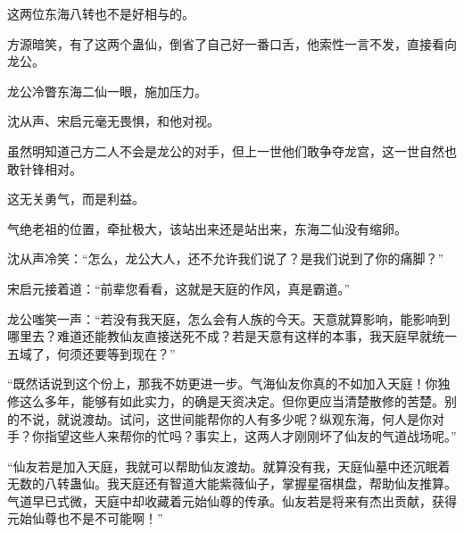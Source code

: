 \begin{this_body}
这两位东海八转也不是好相与的。

方源暗笑，有了这两个蛊仙，倒省了自己好一番口舌，他索性一言不发，直接看向龙公。

龙公冷瞥东海二仙一眼，施加压力。

沈从声、宋启元毫无畏惧，和他对视。

虽然明知道己方二人不会是龙公的对手，但上一世他们敢争夺龙宫，这一世自然也敢针锋相对。

这无关勇气，而是利益。

气绝老祖的位置，牵扯极大，该站出来还是站出来，东海二仙没有缩卵。

沈从声冷笑：“怎么，龙公大人，还不允许我们说了？是我们说到了你的痛脚？”

宋启元接着道：“前辈您看看，这就是天庭的作风，真是霸道。”

龙公嗤笑一声：“若没有我天庭，怎么会有人族的今天。天意就算影响，能影响到哪里去？难道还能教仙友直接送死不成？若是天意有这样的本事，我天庭早就统一五域了，何须还要等到现在？”

“既然话说到这个份上，那我不妨更进一步。气海仙友你真的不如加入天庭！你独修这么多年，能够有如此实力，的确是天资决定。但你更应当清楚散修的苦楚。别的不说，就说渡劫。试问，这世间能帮你的人有多少呢？纵观东海，何人是你对手？你指望这些人来帮你的忙吗？事实上，这两人才刚刚坏了仙友的气道战场呢。”

“仙友若是加入天庭，我就可以帮助仙友渡劫。就算没有我，天庭仙墓中还沉眠着无数的八转蛊仙。我天庭还有智道大能紫薇仙子，掌握星宿棋盘，帮助仙友推算。气道早已式微，天庭中却收藏着元始仙尊的传承。仙友若是将来有杰出贡献，获得元始仙尊也不是不可能啊！”

\end{this_body}

